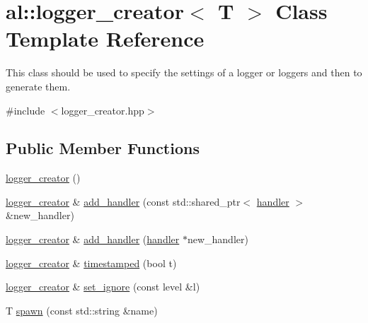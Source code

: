 \hypertarget{classal_1_1logger__creator}{\section{al\-:\-:logger\-\_\-creator$<$ \-T $>$ \-Class \-Template \-Reference}
\label{classal_1_1logger__creator}
}


\-This class should be used to specify the settings of a logger or loggers and then to generate them.  




{\ttfamily \#include $<$logger\-\_\-creator.\-hpp$>$}

\subsection*{\-Public \-Member \-Functions}
\begin{DoxyCompactItemize}
\item 
\hyperlink{classal_1_1logger__creator_a35e1652aaa0a7f2c9efd3a8b9b49031a}{logger\-\_\-creator} ()
\item 
\hyperlink{classal_1_1logger__creator}{logger\-\_\-creator} \& \hyperlink{classal_1_1logger__creator_a4a9a6b5cdad5b1b1dd7834e44190277c}{add\-\_\-handler} (const std\-::shared\-\_\-ptr$<$ \hyperlink{classal_1_1handler}{handler} $>$ \&new\-\_\-handler)
\item 
\hyperlink{classal_1_1logger__creator}{logger\-\_\-creator} \& \hyperlink{classal_1_1logger__creator_a46ca3d1c26b3f4e1f0bc04995950def3}{add\-\_\-handler} (\hyperlink{classal_1_1handler}{handler} $\ast$new\-\_\-handler)
\item 
\hyperlink{classal_1_1logger__creator}{logger\-\_\-creator} \& \hyperlink{classal_1_1logger__creator_aa98cc9aef7d054d2ac0feb5e7f176dff}{timestamped} (bool t)
\item 
\hyperlink{classal_1_1logger__creator}{logger\-\_\-creator} \& \hyperlink{classal_1_1logger__creator_ab0d683f294d10a8326b79f411616a530}{set\-\_\-ignore} (const level \&l)
\item 
\-T \hyperlink{classal_1_1logger__creator_afb665d5356529217ea15810d889a85c1}{spawn} (const std\-::string \&name)
\end{DoxyCompactItemize}

